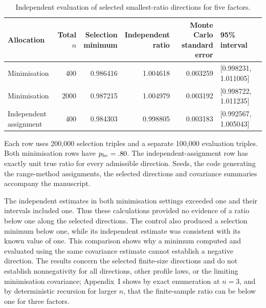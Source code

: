 \documentclass[12pt,a4paper]{article}
\theoremstyle{definition}
\theoremstyle{remark}\newtheorem{remark}{Remark}
\numberwithin{equation}{section}
\begin{document}
\begin{table}[!htbp]
\centering
\caption{Independent evaluation of selected smallest-ratio directions for five factors.}
\label{tab:supp-independent-directions}
\begin{threeparttable}
\begin{singlespace}
\small
\setlength{\tabcolsep}{4pt}
\begin{tabular}{@{}lrrrrl@{}}
\toprule
Allocation & Total $n$ & \shortstack{Selection\\minimum} & \shortstack{Independent\\ratio} & \shortstack{Monte Carlo\\standard error} & 95\% interval\\
\midrule
Minimisation & 400 & 0.986416 & 1.004618 & 0.003259 & [0.998231, 1.011005]\\
Minimisation & 2000 & 0.987215 & 1.004979 & 0.003192 & [0.998722, 1.011235]\\
\shortstack[l]{Independent\\assignment} & 400 & 0.984303 & 0.998805 & 0.003183 & [0.992567, 1.005043]\\
\bottomrule
\end{tabular}
\begin{tablenotes}[flushleft]\small
\item Each row uses 200,000 selection triples and a separate 100,000 evaluation triples. Both minimisation rows have $p_{\rm bc}=.80$. The independent-assignment row has exactly unit true ratio for every admissible direction. Seeds, the code generating the range-method assignments, the selected directions and covariance summaries accompany the manuscript.
\end{tablenotes}
\end{singlespace}
\end{threeparttable}
\end{table}

The independent estimates in both minimisation settings exceeded one and their intervals included one. Thus these calculations provided no evidence of a ratio below one along the selected directions. The control also produced a selection minimum below one, while its independent estimate was consistent with its known value of one. This comparison shows why a minimum computed and evaluated using the same covariance estimate cannot establish a negative direction. The results concern the selected finite-size directions and do not establish nonnegativity for all directions, other profile laws, or the limiting minimisation covariance; Appendix~I shows by exact enumeration at $n=3$, and by deterministic recursion for larger $n$, that the finite-sample ratio can be below one for three factors.
\end{document}
